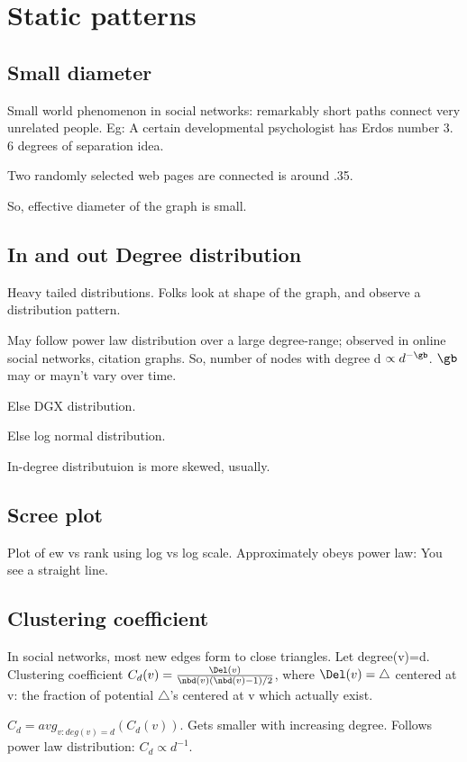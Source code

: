 \documentclass[oneside, article]{memoir}
\begin{document}
\section{Static patterns}
\subsection{Small diameter}
Small world phenomenon in social networks: remarkably short paths connect very unrelated people. Eg: A certain developmental psychologist has Erdos number 3. 6 degrees of separation idea.

Two randomly selected web pages are connected is around .35.

So, effective diameter of the graph is small.

\subsection{In and out Degree distribution}
Heavy tailed distributions. Folks look at shape of the graph, and observe a distribution pattern.

May follow power law distribution over a large degree-range; observed in online social networks, citation graphs. So, number of nodes with degree d $\propto d^{-\gb}$. $\gb$ may or mayn't vary over time.

Else DGX distribution.

Else log normal distribution.

In-degree distributuion is more skewed, usually.

\subsection{Scree plot}
Plot of ew vs rank using log vs log scale. Approximately obeys power law: You see a straight line.

\subsection{Clustering coefficient}
In social networks, most new edges form to close triangles. Let degree(v)=d. Clustering coefficient $C_{d}(v) = \frac{\Del(v)}{\nbd(v)(\nbd(v)-1)/2}$, where $\Del(v) = \triangle$ centered at v: the fraction of potential $\triangle$'s centered at v which actually exist.

$C_{d} = avg_{v:deg(v)=d}(C_{d}(v))$. Gets smaller with increasing degree. Follows power law distribution: $C_{d} \propto d^{-1}$.
\end{document}
